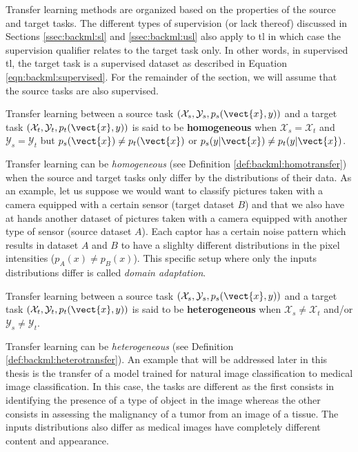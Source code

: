 Transfer learning methods are organized based on the properties of the source and
target tasks. The different types of supervision (or lack thereof) discussed in
Sections \ref{ssec:backml:sl} and \ref{ssec:backml:usl} also apply to \acrlong{tl}
in which case the supervision qualifier relates to the target task only. In other
words, in supervised \acrlong{tl}, the target task is a supervised dataset as
described in Equation \ref{eqn:backml:supervised}. For the remainder of the section,
we will assume that the source tasks are also supervised.

\begin{definition}
  \label{def:backml:homotransfer}
  Transfer learning between a source task $\left(\mathcal{X}_{s}, \mathcal{Y}_{s}, p_{s}(\vect{x}, y)\right)$ and a target task $\left(\mathcal{X}_t, \mathcal{Y}_t, p_t(\vect{x}, y)\right)$ is said to be \textbf{homogeneous} when $\mathcal{X}_s = \mathcal{X}_t$ and $\mathcal{Y}_s = \mathcal{Y}_t$ but $p_s(\vect{x}) \neq p_t(\vect{x})$ or $p_s(y|\vect{x}) \neq p_t(y|\vect{x})$.
\end{definition}

Transfer learning can be \textit{homogeneous} (see Definition \ref{def:backml:homotransfer})
when the source and target tasks only differ by the distributions of their data.
As an example, let us suppose we would want to classify pictures taken with a
camera equipped with a certain sensor (target dataset $B$) and that we also have
at hands another dataset of pictures taken with a camera equipped with another
type of sensor (source dataset $A$). Each captor has a certain noise pattern which
results in dataset $A$ and $B$ to have a slighlty different distributions in the
pixel intensities (\ie $p_A(x) \neq p_B(x)$). This specific setup where only the
inputs distributions differ is called \textit{domain adaptation}.

\begin{definition}
  \label{def:backml:heterotransfer}
  Transfer learning between a source task $\left(\mathcal{X}_{s}, \mathcal{Y}_{s}, p_{s}(\vect{x}, y)\right)$ and a target task $\left(\mathcal{X}_t, \mathcal{Y}_t, p_t(\vect{x}, y)\right)$ is said to be \textbf{heterogeneous} when $\mathcal{X}_s \neq \mathcal{X}_t$ and/or $\mathcal{Y}_s \neq \mathcal{Y}_t$.
\end{definition}

Transfer learning can be \textit{heterogeneous} (see Definition
\ref{def:backml:heterotransfer}). An example that will be addressed later in this
thesis is the transfer of a model trained for natural image classification to
medical image classification. In this case, the tasks are different as the first
consists in identifying the presence of a type of object in the image whereas the
other consists in assessing the malignancy of a tumor from an image of a tissue.
The inputs distributions also differ as medical images have completely different
content and appearance.


